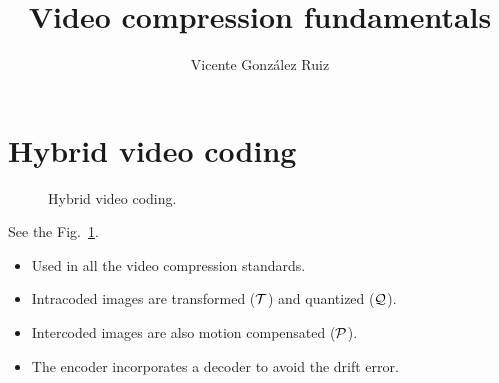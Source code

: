 \title{Video compression fundamentals}
\author{Vicente González Ruiz}
\maketitle
\tableofcontents

\section{}

\section{Hybrid video coding}

\begin{figure}
  \caption{Hybrid video coding.}
  \label{fig:hybrid_coding}
\end{figure}

See the Fig.~\ref{fig:hybrid_coding}.

\begin{itemize}
\tightlist
\item
  Used in all the video compression standards.
\item
  Intracoded images are transformed ($\cal T$) and quantized ($\cal
  Q$).
\item
  Intercoded images are also motion compensated ($\cal P$).
\item
  The encoder incorporates a decoder to avoid the drift error.
\end{itemize}

